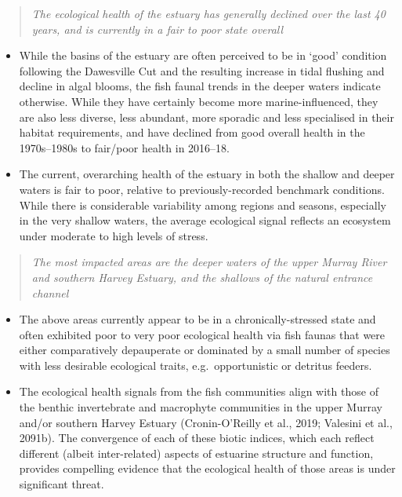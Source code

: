 \documentclass[
]{book}
\begin{document}
\begin{quote}
\emph{The ecological health of the estuary has generally declined over the last 40 years, and is currently in a fair to poor state overall}
\end{quote}

\begin{itemize}
\item
  While the basins of the estuary are often perceived to be in `good' condition following the Dawesville Cut and the resulting increase in tidal flushing and decline in algal blooms, the fish faunal trends in the deeper waters indicate otherwise. While they have certainly become more marine-influenced, they are also less diverse, less abundant, more sporadic and less specialised in their habitat requirements, and have declined from good overall health in the 1970s--1980s to fair/poor health in 2016--18.
\item
  The current, overarching health of the estuary in both the shallow and deeper waters is fair to poor, relative to previously-recorded benchmark conditions. While there is considerable variability among regions and seasons, especially in the very shallow waters, the average ecological signal reflects an ecosystem under moderate to high levels of stress.
\end{itemize}

\begin{quote}
\emph{The most impacted areas are the deeper waters of the upper Murray River and southern Harvey Estuary, and the shallows of the natural entrance channel}
\end{quote}

\begin{itemize}
\item
  The above areas currently appear to be in a chronically-stressed state and often exhibited poor to very poor ecological health via fish faunas that were either comparatively depauperate or dominated by a small number of species with less desirable ecological traits, e.g.~opportunistic or detritus feeders.
\item
  The ecological health signals from the fish communities align with those of the benthic invertebrate and macrophyte communities in the upper Murray and/or southern Harvey Estuary (Cronin-O'Reilly et al., 2019; Valesini et al., 2091b). The convergence of each of these biotic indices, which each reflect different (albeit inter-related) aspects of estuarine structure and function, provides compelling evidence that the ecological health of those areas is under significant threat.
\end{itemize}
\end{document}
